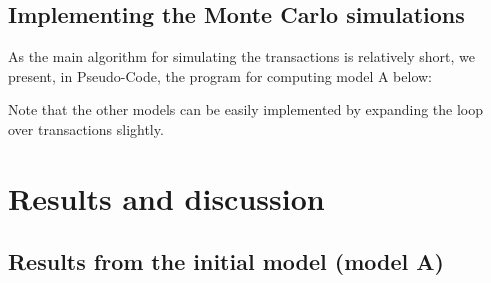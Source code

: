 \documentclass[a4paper, 10pt]{article}
\begin{document}
\subsection{Implementing the Monte Carlo simulations}
As the main algorithm for simulating the transactions is relatively short, we present, in Pseudo-Code, the program for computing model A below:

Note that the other models can be easily implemented by expanding the loop over transactions slightly.
\pagebreak



\section{Results and discussion}
\subsection{Results from the initial model (model A)}
\end{document}
